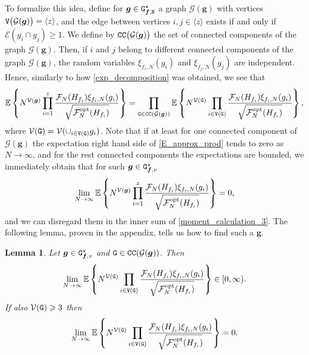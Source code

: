 \documentclass[11pt,reqno]{amsart}
\numberwithin{equation}{section}
\newcommand{\sprod}[1]{\langle#1\rangle}
\newcommand{\E}[1]{\mathbb{E}\left\{ #1\right\}}
\newtheorem{lem}[theo]{Lemma}
\newcommand{\kb}[1]{\boldsymbol{#1}}
\newcommand{\vk}[1]{\kb{#1}}
\begin{document}
{To formalize this idea,} {define for $\vk g\in\tt G^{\star}_{\vk f,N}$}  a graph $\mathcal{G}(\vk g)$ with vertices ${\tt V}\bigl(\mathcal{G}(\vk g)\bigr)=\sprod{z}$, and the edge between vertices $i,j\in\sprod{z}$ exists if and only if $\mathcal{E}(g_i\cap g_j)\geqslant 1$. We define by ${\tt CC}\bigl(\mathcal{G}(\vk g)\bigr)$ the set of connected components of the graph $\mathcal{G}(\vk g)$. Then, {if $i$ and $j$ belong to different connected components of the graph $\mathcal{G}(\vk g)$, the  random variables $\xi_{f_i, N}(g_i)$ and $\xi_{f_j, N}(g_j)$ are independent.} {Hence,} similarly to how \eqref{exp_decomposition} was obtained, we see that
\begin{align}
    \E{N^{\mathcal{V}(\vk{g})}\prod_{i=1}^{z}\frac{\mathcal{F}_{{N}}({H}_{f_i})\xi_{f_i,{N}}(g_i)}{\sqrt{\mathcal{F}^{\rm opt}_N({H}_{f_i})}}} = \prod_{{\tt G}\in {\tt CC}(\mathcal{G}(\vk g))} \E{N^{\mathcal{V}({\tt G})}\prod_{i\in{\tt V}({\tt G})}\frac{\mathcal{F}_{{N}}({H}_{f_i})\xi_{f_i,{N}}(g_i)}{\sqrt{\mathcal{F}^{\rm opt}_N({H}_{f_i})}}}\label{E_approx_prod},
\end{align}
where $\mathcal{V}({\tt G}) = \mathcal{V}(\cup_{i\in{\tt V}({\tt G})}g_i)$. Note that if at least for one connected component of $\mathcal{G}(\vk g)$ the expectation right hand side of \eqref{E_approx_prod} tends to zero as $N\to\infty$, and for the rest connected components the expectations are bounded, we immediately obtain that for such $\vk g\in{\tt G}^{\star}_{\vk f,v}$
\begin{align*}
    \lim_{N\to\infty}\E{N^{\mathcal{V}(\vk{g})}\prod_{i=1}^{z}\frac{\mathcal{F}_{{N}}({H}_{f_i})\xi_{f_i,{N}}(g_i)}{\sqrt{\mathcal{F}^{\rm opt}_N({H}_{f_i})}}} = 0,
\end{align*}
and we can disregard them in the inner sum of \eqref{moment_calculation_3}. The following lemma, proven in the appendix, tells us how to find such a $\vk g$.

\begin{lem}\label{lem:connected_components}
    Let $\vk g\in{\tt G}^{\star}_{\vk f,v}$ and ${\tt G}\in{\tt CC}(\mathcal{G}(\vk g))$. Then
    \begin{align*}
        \lim_{N\to\infty}\E{N^{\mathcal{V}({\tt G})}\prod_{i\in{\tt V}({\tt G})}\frac{\mathcal{F}_{{N}}({H}_{f_i})\xi_{f_i,{N}}(g_i)}{\sqrt{\mathcal{F}^{\rm opt}_N({H}_{f_i})}}}\in[0,\infty).
    \end{align*}
    If also $\mathcal{V}({\tt G})\geqslant 3$ then
    \begin{align*}
        \lim_{N\to\infty}\E{N^{\mathcal{V}({\tt G})}\prod_{i\in{\tt V}({\tt G})}\frac{\mathcal{F}_{{N}}({H}_{f_i})\xi_{f_i,{N}}(g_i)}{\sqrt{\mathcal{F}^{\rm opt}_N({H}_{f_i})}}}=0.
    \end{align*}
\end{lem}
\end{document}
